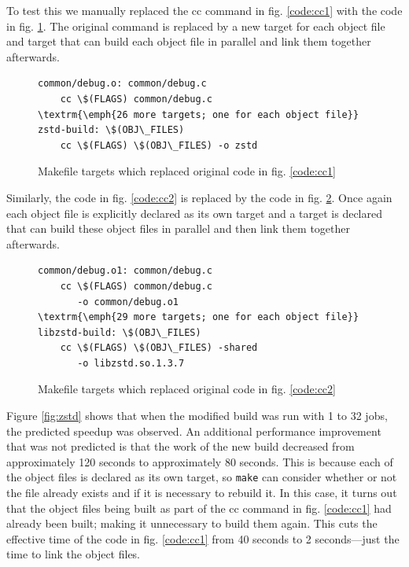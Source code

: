 \documentclass[sigconf,10pt,authorversion]{acmart}\settopmatter{printfolios=true,printccs=false,printacmref=false}
\begin{document}
To test this we manually replaced the cc command in
fig. \ref{code:cc1} with the code in fig.  \ref{code:cc3}.  The
original command is replaced by a new target for each object file and
target that can build each object file in parallel and link them
together afterwards.

\begin{figure}[H]
\begin{Verbatim}[commandchars=\\\{\},codes={\catcode`$=3\catcode`^=7\catcode`_=8},fontsize=\small]
common/debug.o: common/debug.c                                                       
    cc \$(FLAGS) common/debug.c
\textrm{\emph{26 more targets; one for each object file}}    
zstd-build: \$(OBJ\_FILES)
    cc \$(FLAGS) \$(OBJ\_FILES) -o zstd
\end{Verbatim}
\caption{Makefile targets which replaced original code in fig. \ref{code:cc1}}
\label{code:cc3}
\end{figure}

Similarly, the code in fig. \ref{code:cc2} is replaced by the code in
fig. \ref{code:cc4}.  Once again each object file is explicitly
declared as its own target and a target is declared that can build
these object files in parallel and then link them together afterwards.

\begin{figure}[H]
  \begin{Verbatim}[commandchars=\\\{\},codes={\catcode`$=3\catcode`^=7\catcode`_=8},fontsize=\small]
common/debug.o1: common/debug.c
    cc \$(FLAGS) common/debug.c
       -o common/debug.o1
\textrm{\emph{29 more targets; one for each object file}}
libzstd-build: \$(OBJ\_FILES)
    cc \$(FLAGS) \$(OBJ\_FILES) -shared
       -o libzstd.so.1.3.7
\end{Verbatim}
\caption{Makefile targets which replaced original code in fig. \ref{code:cc2}}
\label{code:cc4}
\end{figure}

Figure \ref{fig:zstd} shows that when the modified build was run with
1 to 32 jobs, the predicted speedup was observed.  An additional
performance improvement that was not predicted is that the work of the
new build decreased from approximately 120 seconds to approximately 80
seconds.  This is because each of the object files is declared as its
own target, so \verb|make| can consider whether or not the file
already exists and if it is necessary to rebuild it.  In this case, it
turns out that the object files being built as part of the cc command
in fig. \ref{code:cc1} had already been built; making it unnecessary
to build them again.  This cuts the effective time of the code in fig.
\ref{code:cc1} from 40 seconds to 2 seconds---just the time to link
the object files.
\end{document}
